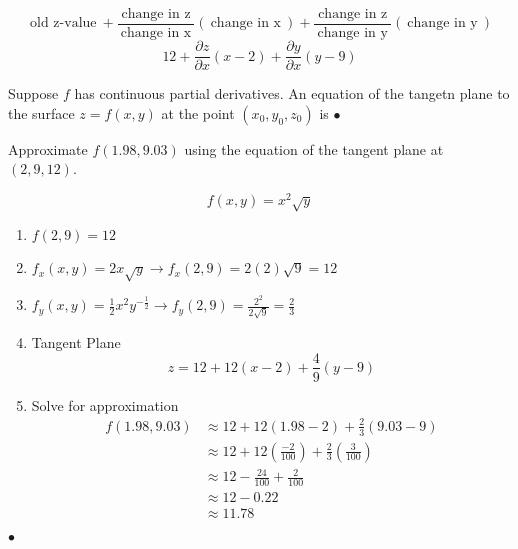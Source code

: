 	\[\:\text{old z-value}\: + \frac{\:\text{change in z}\:}{\:\text{change in x}\:}(\:\text{change in x}\:)
	+ \frac{\:\text{change in z}\:}{\:\text{change in y}\:}(\:\text{change in y}\:)\]
	\[12 + \frac{\partial z}{\partial x} (x-2) + \frac{\partial y}{\partial x}(y-9) \]
\begin{theorem}[]
	Suppose $f$ has continuous partial derivatives. An equation of the tangetn plane to the surface
	$z=f(x,y)$ at the point $(x_0,y_0,z_0)$ is
\smallskip\hfill$\bullet$\end{theorem}
\begin{example}

	Approximate $f(1.98,9.03)$ using the equation of the tangent plane at $(2,9,12)$.

	\[f(x,y) = x^2 \sqrt{y} \]
	\begin{enumerate}
		\item $f(2,9) = 12$
		\item $f_{x}(x,y) = 2x \sqrt{y} \to f_{x}(2,9) = 2(2)\sqrt{9} = 12$
		\item $f_{y}(x,y) = \frac{1}{2}x^2 y^{-\frac{1}{2}} \to f_{y}(2,9) = \frac{2^2}{2\sqrt{9} }= \frac{2}{3}$
			\item Tangent Plane
	\[z = 12 + 12(x-2) + \frac{4}{9}(y-9)\]
	\item Solve for approximation
		\begin{align*}
		f(1.98,9.03) &\approx 12 + 12(1.98-2) + \frac{2}{3}(9.03 - 9) \\
					 &\approx 12 + 12(\frac{-2}{100}) + \frac{2}{3}(\frac{3}{100})\\
					 &\approx 12 -\frac{24}{100} + \frac{2}{100}\\
					 &\approx 12 -0.22 \\
					 &\approx \boxed{11.78}
		\end{align*}
	\end{enumerate}


\smallskip\hfill$\bullet$\end{example}










\newpage


